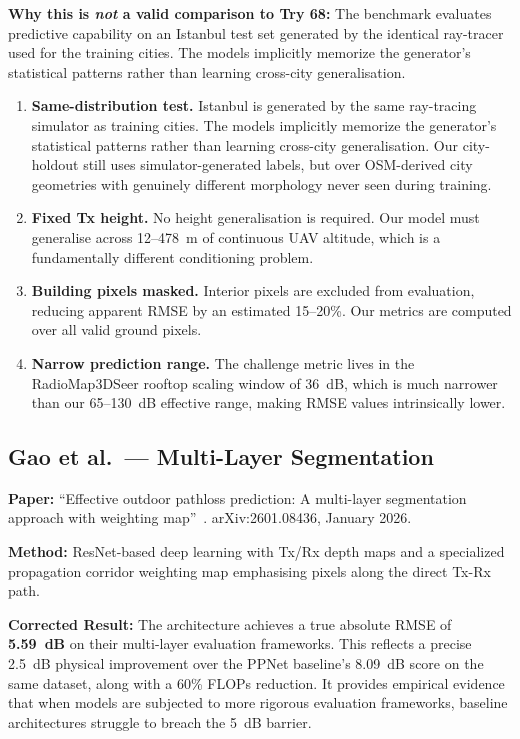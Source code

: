 \documentclass[11pt,a4paper]{article}
\begin{document}
\textbf{Why this is \emph{not} a valid comparison to Try 68:} The benchmark evaluates predictive capability on an Istanbul test set generated by the identical ray-tracer used for the training cities. The models implicitly memorize the generator's statistical patterns rather than learning cross-city generalisation.
\begin{enumerate}[nosep]
    \item \textbf{Same-distribution test.} Istanbul is generated by the same
          ray-tracing simulator as training cities. The models implicitly memorize
          the generator's statistical patterns rather than learning cross-city
          generalisation. Our city-holdout still uses simulator-generated labels,
          but over OSM-derived city geometries with genuinely different morphology
          never seen during training.

    \item \textbf{Fixed Tx height.} No height generalisation is required.
          Our model must generalise across 12--478~m of continuous UAV altitude,
          which is a fundamentally different conditioning problem.

    \item \textbf{Building pixels masked.} Interior pixels are excluded from
          evaluation, reducing apparent RMSE by an estimated 15--20\%. Our metrics
          are computed over all valid ground pixels.

    \item \textbf{Narrow prediction range.} The challenge metric lives in the
          RadioMap3DSeer rooftop scaling window of 36~dB, which is much narrower
          than our 65--130~dB effective range, making RMSE values intrinsically lower.
\end{enumerate}

\subsection{Gao et al.\ --- Multi-Layer Segmentation}

\textbf{Paper:} ``Effective outdoor pathloss prediction: A multi-layer segmentation
approach with weighting map''~\cite{gao2026}. arXiv:2601.08436, January 2026.

\textbf{Method:} ResNet-based deep learning with Tx/Rx depth maps and a specialized propagation corridor weighting map emphasising pixels along the direct Tx-Rx path.

\textbf{Corrected Result:} The architecture achieves a true absolute RMSE of \textbf{5.59~dB} on their multi-layer evaluation frameworks. This reflects a precise 2.5~dB physical improvement over the PPNet baseline's 8.09~dB score on the same dataset, along with a 60\% FLOPs reduction. It provides empirical evidence that when models are subjected to more rigorous evaluation frameworks, baseline architectures struggle to breach the 5~dB barrier.
\end{document}
